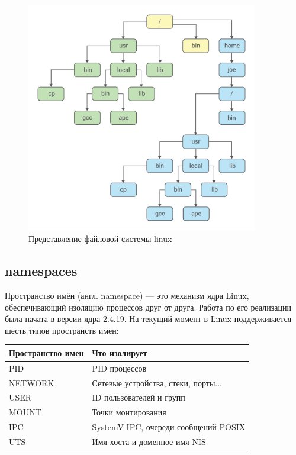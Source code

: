 \begin{figure}[h!]
\centering
\includegraphics[width=0.9\textwidth]{img/chroot.png}
\caption{Представление файловой системы linux}
\label{chroot}
\end{figure}

\subsection{namespaces}

Пространство имён (англ. namespace) — это механизм ядра Linux, обеспечивающий изоляцию процессов друг от друга. Работа по его реализации была начата в версии ядра 2.4.19. На текущий момент в Linux поддерживается шесть типов пространств имён:

\begin{table}[]
\begin{tabular}{|l|l|}
\hline
Пространство имен & Что изолирует  \\ \hline
PID & PID процессов  \\ \hline
NETWORK & Сетевые устройства, стеки, порты... \\ \hline
USER & ID пользователей и групп \\ \hline
MOUNT & Точки монтирования \\ \hline
IPC & SystemV IPC, очереди сообщений POSIX \\ \hline
UTS & Имя хоста и доменное имя NIS \\ \hline
\end{tabular}
\end{table}

